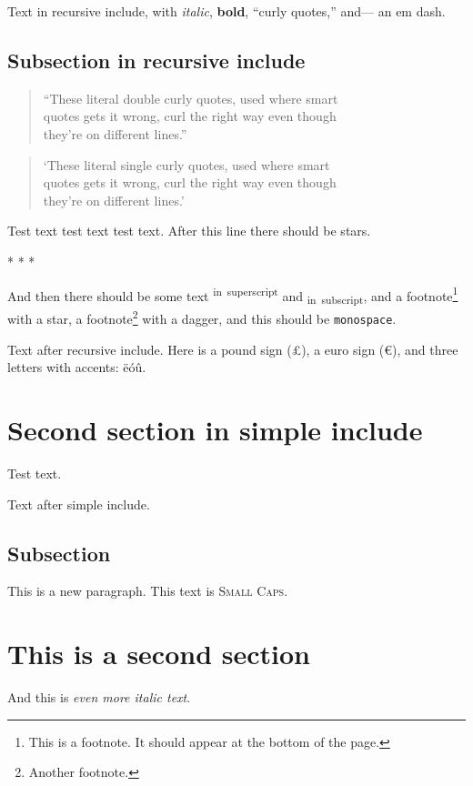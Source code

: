 \documentclass[
  12pt,
  british,
  a4paper,
]{article}
\newif\iffootnote
\let\Footnote\footnote
\renewcommand\footnote[1]{\begingroup\footnotetrue\Footnote{#1}\endgroup}
\let\OldRule\rule
\renewcommand{\rule}[2]{\iffootnote\OldRule{#1}{#2}\else* * *\fi}
\begin{document}
Text in recursive include, with \emph{italic}, \textbf{bold}, ``curly
quotes,'' and--- an em dash.

\hypertarget{subsection-in-recursive-include}{%
\subsection{Subsection in recursive
include}\label{subsection-in-recursive-include}}

\begin{quote}
``These literal double curly quotes, used where smart\\
quotes gets it wrong, curl the right way even though\\
they're on different lines.''
\end{quote}

\begin{quote}
`These literal single curly quotes, used where smart\\
quotes gets it wrong, curl the right way even though\\
they're on different lines.'
\end{quote}

Test text test text test text. After this line there should be stars.

\begin{center}\rule{0.5\linewidth}{0.5pt}\end{center}

And then there should be some text \textsuperscript{in~superscript} and
\textsubscript{in~subscript}, and a footnote\footnote{This is a
  footnote. It should appear at the bottom of the page.} with a star, a
footnote\footnote{Another footnote.} with a dagger, and this should be
\texttt{monospace}.

Text after recursive include. Here is a pound sign (£), a euro sign (€),
and three letters with accents: ëóû.

\hypertarget{second-section-in-simple-include}{%
\section{Second section in simple
include}\label{second-section-in-simple-include}}

Test text.

Text after simple include.

\hypertarget{subsection}{%
\subsection{Subsection}\label{subsection}}

This is a new paragraph. This text is \textsc{Small Caps}.

\hypertarget{this-is-a-second-section}{%
\section{This is a second section}\label{this-is-a-second-section}}

And this is \emph{even more italic text}.
\end{document}
